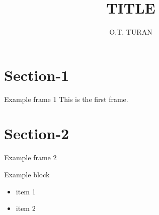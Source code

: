 \documentclass{beamer}
\title[]{TITLE}
\institute[]{Delft University of Technology, The Netherlands}
\author{O.T. TURAN}
\begin{document}
{
\def\beamer@entrycode{\vspace*{-\headheight}}
\frame{\titlepage}
}

{

}

\section{Section-1}
\begin{frame}{Example frame 1}
This is the first frame. \@author{}
\end{frame}

\section{Section-2}

\begin{frame}{Example frame 2}
\begin{block}{Example block}
\begin{itemize}
\item item 1
\item item 2
\end{itemize}
\end{block}
\end{frame}
\end{document}
